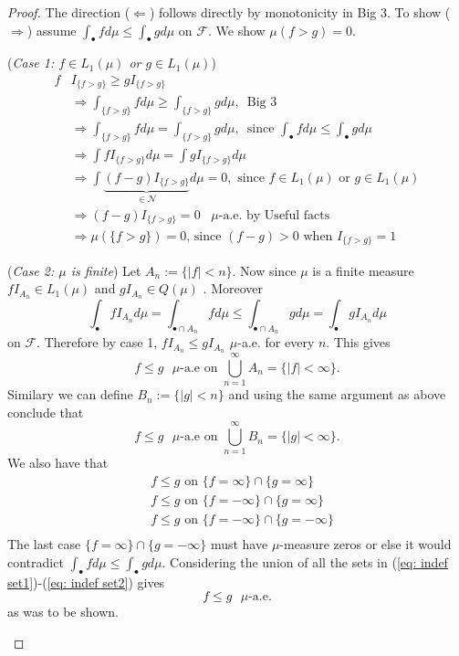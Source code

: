 \begin{proof}
The direction ($\Longleftarrow$) follows directly by monotonicity in Big 3. To show ($\Longrightarrow$) assume $\textstyle\int_\bullet fd\mu \leq \textstyle\int_\bullet gd\mu$ on $\mathcal F$. We show $\mu(f>g)=0$.

\begin{flushleft}
\textbullet({\sl Case 1: $f\in L_1(\mu)$ or $g\in L_1(\mu)$})
\begin{align*}
f &I_{\{ f>g \} }\geq g I_{\{ f>g \} } \\
&\Longrightarrow \int_{\{ f>g\}} fd\mu \geq \int_{\{ f>g\}} gd\mu,\,\text{ Big 3} \\
&\Longrightarrow \int_{\{ f>g\}} fd\mu = \int_{\{ f>g\}} gd\mu,\,\text{ since $\textstyle\int_\bullet fd\mu \leq \textstyle\int_\bullet gd\mu$} \\
&\Longrightarrow \int f I_{\{ f>g\}} d\mu =  \int gI_{\{ f>g\}} d\mu  \\
&\Longrightarrow \int \underbrace{(f - g)I_{\{ f>g\}}}_{\in\mathscr N} d\mu = 0, \text{ since  $f\in L_1(\mu)$ or $g\in L_1(\mu)$}  \\
&\Longrightarrow  (f - g)I_{\{ f>g\}} = 0\,\text{ $\mu$-a.e.  by Useful facts}\\
&\Longrightarrow  \mu(\{ f>g\}) = 0,\,\text{since $(f-g)>0$ when $I_{\{ f>g\}}=1$ }
\end{align*}
\end{flushleft}

\begin{flushleft}
\textbullet({\sl Case 2: $\mu$ is finite}) Let $A_n:=\{|f|<n\}$. Now since $\mu$ is a finite measure $fI_{A_n}\in L_1(\mu)$ and $gI_{A_n}\in Q(\mu)$ . Moreover
\[\int_\bullet fI_{A_n} d\mu = \int_{\bullet\cap A_n} f d\mu \leq \int_{\bullet\cap A_n} g d\mu = \int_\bullet gI_{A_n} d\mu\]
 on $\mathcal F$.
Therefore by case 1, $fI_{A_n}\leq gI_{A_n}$ $\mu$-a.e. for every $n$. This gives
\begin{equation}
\text{$f\leq g$ $\mu$-a.e on $\bigcup_{n=1}^\infty A_n=\{|f|<\infty \}$}. \label{eq: indef set1}\end{equation}
Similary we can define $B_n:=\{|g|<n\}$ and using the same argument as above conclude that
\begin{equation} \text{$f\leq g$ $\mu$-a.e on $\bigcup_{n=1}^\infty B_n=\{|g|<\infty \}$}. \label{eq: indef set2}\end{equation}
We also have that
\begin{align}
&\text{$f\leq g$ on $\{f = \infty\}\cap \{g = \infty \}$}\label{eq: indef set2}\\
&\text{$f\leq g$ on $\{f = -\infty\}\cap \{g = \infty \}$}\label{eq: indef set2}\\
&\text{$f\leq g$ on $\{f = -\infty\}\cap \{g = -\infty \}$}\label{eq: indef set2}\\
\end{align}
The last case $\{f = \infty\}\cap \{g = -\infty \}$ must have $\mu$-measure zeros or else it would contradict $\int_\bullet fd\mu\leq \int_\bullet gd\mu$. Considering the union of all the sets in (\ref{eq: indef set1})-(\ref{eq: indef set2}) gives
\[
\text{$f\leq g$ $\mu$-a.e.}
\]
as was to be shown.
\end{flushleft}


\end{proof}
